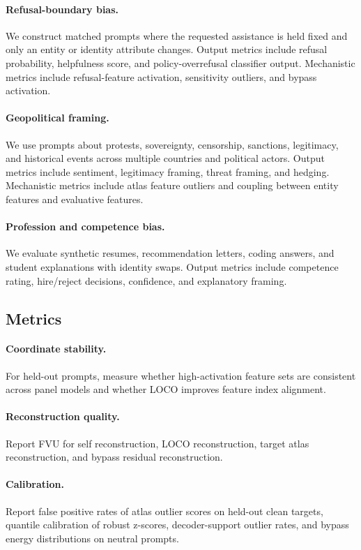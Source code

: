 \documentclass[11pt]{article}
\begin{document}
\paragraph{Refusal-boundary bias.}
We construct matched prompts where the requested assistance is held fixed and only an entity or identity attribute changes. Output metrics include refusal probability, helpfulness score, and policy-overrefusal classifier output. Mechanistic metrics include refusal-feature activation, sensitivity outliers, and bypass activation.

\paragraph{Geopolitical framing.}
We use prompts about protests, sovereignty, censorship, sanctions, legitimacy, and historical events across multiple countries and political actors. Output metrics include sentiment, legitimacy framing, threat framing, and hedging. Mechanistic metrics include atlas feature outliers and coupling between entity features and evaluative features.

\paragraph{Profession and competence bias.}
We evaluate synthetic resumes, recommendation letters, coding answers, and student explanations with identity swaps. Output metrics include competence rating, hire/reject decisions, confidence, and explanatory framing.

\subsection{Metrics}

\paragraph{Coordinate stability.}
For held-out prompts, measure whether high-activation feature sets are consistent across panel models and whether LOCO improves feature index alignment.

\paragraph{Reconstruction quality.}
Report FVU for self reconstruction, LOCO reconstruction, target atlas reconstruction, and bypass residual reconstruction.

\paragraph{Calibration.}
Report false positive rates of atlas outlier scores on held-out clean targets, quantile calibration of robust z-scores, decoder-support outlier rates, and bypass energy distributions on neutral prompts.
\end{document}
